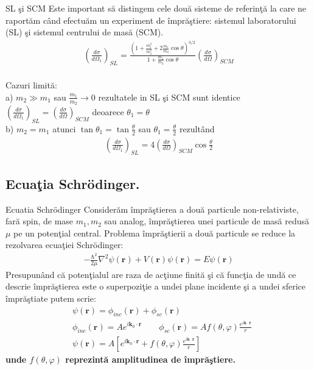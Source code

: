 \begin{frame}[allowframebreaks]{SL \c{s}i SCM}
Este important s\u{a} distingem cele dou\u{a} sisteme de referin\c{t}\u{a} la care ne raport\u{a}m c\^{a}nd efectu\u{a}m un experiment de \^impr\u{a}\c{s}tiere: sistemul laboratorului (SL) \c{s}i sistemul centrului de mas\u{a} (SCM).
\begin{align}
\left(\frac{d\sigma}{d\Omega_1}\right)_{SL}=\frac{(1+\frac{m^2_1}{m^2_2}+2\frac{m_1}{m_2}\cos\theta)^{3/2}}{1+\frac{m_1}{m_2}\cos\theta}\left(\frac{d\sigma}{d\Omega}\right)_{SCM}
\end{align}
\\
Cazuri limit\u{a}:\\
a) $m_2\gg m_1$ sau $\frac{m_1}{m_2} \xrightarrow{}0$ rezultatele in SL \c{s}i SCM sunt identice $\left(\frac{d\sigma}{d\Omega_1}\right)_{SL}=\left(\frac{d\sigma}{d\Omega}\right)_{SCM}$ deoarece $\theta_1=\theta$\\
b) $m_2=m_1$ atunci $\tan\theta_1=\tan\frac{\theta}{2}$ sau $\theta_1=\frac{\theta}{2}$ rezult\^{a}nd 
\begin{align}
\boxed{\left(\frac{d\sigma}{d\Omega_1}\right)_{SL}=4\left(\frac{d\sigma}{d\Omega}\right)_{SCM}\cos\frac{\theta}{2}}
\end{align}


\end{frame} 

\subsection{Ecua\c{t}ia Schr\"{o}dinger.}
\begin{frame}[allowframebreaks]{Ecuatia Schr\"{o}dinger}
Consider\u{a}m \^impr\u{a}\c{s}tierea a dou\u{a} particule non-relativiste, far\u{a} spin, de mase $m_1,m_2$ sau analog, \^impr\u{a}\c{s}tierea unei particule de mas\u{a} redus\u{a} $\mu$ pe un poten\c{t}ial central.
Problema \^{i}mpr\u{a}\c{s}tierii a dou\u{a} particule se reduce la rezolvarea ecua\c{t}iei Schr\"{o}dinger:
\begin{align}
-\frac{\hbar^2}{2\mu}\nabla^2\psi({\bm r})+V({\bm r})\psi({\bm r})=E\psi({\bm r})
\end{align}
Presupun\^{a}nd c\u{a} poten\c{t}ialul are raza de ac\c{t}iune finit\u{a} \c{s}i c\u{a} func\c{t}ia de und\u{a} ce descrie \^{i}mpr\u{a}\c{s}tierea este o superpozi\c{t}ie a undei plane incidente \c{s}i a undei sferice \^{i}mpr\u{a}\c{s}tiate putem scrie:
\begin{align}
&\psi({\bm r})=\phi_{inc}({\bm r})+\phi_{sc}({\bm r})\\
&\phi_{inc}({\bm r})=Ae^{i{\bm k_0}\cdot{\bm r}} \qquad \phi_{sc}({\bm r})=A f(\theta,\varphi)\frac{e^{i{\bm k}\cdot{\bm r}}}{r}\\
&\psi({\bm r})=A \left[ e^{i{\bm k_0}\cdot{\bm r}}+f(\theta,\varphi)\frac{e^{i{\bm k}\cdot{\bm r}}}{r}\right]
\end{align}
{\bf unde $f(\theta,\varphi)$ reprezint\u{a} amplitudinea de \^{i}mpr\u{a}\c{s}tiere.}
\end{frame} 


